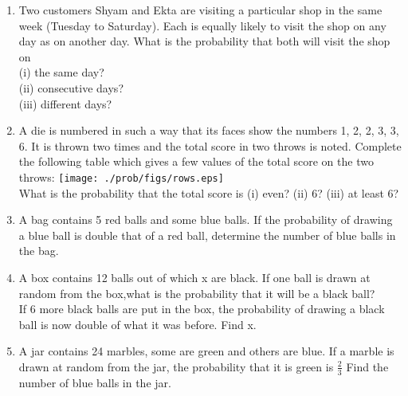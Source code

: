 \begin{enumerate}[label=\arabic*.,ref=\thesubsection.\theenumi]
\solution

\item Two customers Shyam and Ekta are visiting a particular shop in the same week (Tuesday
to Saturday). Each is equally likely to visit the shop on any day as on another day. What
is the probability that both will visit the shop on\\
(i) the same day?\\
(ii) consecutive days?\\
(iii) different days?
\\
\solution

\item A die is numbered in such a way that its faces show the numbers 1, 2, 2, 3, 3, 6. It is thrown two times and the total score in two throws is noted. Complete the following
table which gives a few values of the total score on the two throws:
\texttt{[image: ./prob/figs/rows.eps]}\\
What is the probability that the total score is
(i) even? (ii) 6? (iii) at least 6?
\\
\solution

\item A bag contains 5 red balls and some blue balls. If the probability of drawing a blue ball is double that of a red ball, determine the number of blue balls in the bag.
\\
\solution

\item A box contains 12 balls out of which x are black. If one ball is drawn at random from the box,what is the probability that it will be a black ball?\\
If 6 more black balls are put in the box, the probability of drawing a black ball is now double of what it was before. Find x.
\\
\solution

\item A jar contains 24 marbles, some are green and others are blue. If a marble is drawn at random from the jar, the probability that it is green is $\frac{2}{3}$ Find the number of blue balls in the jar.
    \end{enumerate}
%
    
